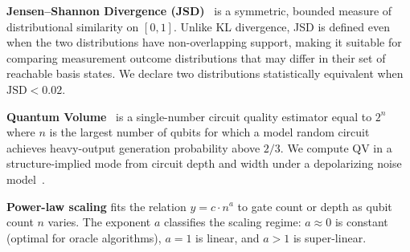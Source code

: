 \textbf{Jensen--Shannon Divergence (JSD)}~\cite{lin1991divergence} is a
symmetric, bounded measure of distributional similarity on $[0, 1]$.
Unlike KL divergence, JSD is defined even when the two distributions
have non-overlapping support, making it suitable for comparing
measurement outcome distributions that may differ in their set of
reachable basis states.
We declare two distributions statistically equivalent when
$\text{JSD} < 0.02$.

\textbf{Quantum Volume}~\cite{cross2019validating} is a single-number
circuit quality estimator equal to $2^n$ where $n$ is the largest number
of qubits for which a model random circuit achieves heavy-output
generation probability above $2/3$.
We compute QV in a structure-implied mode from circuit depth and width
under a depolarizing noise model~\cite{nielsen2010quantum}.

\textbf{Power-law scaling} fits the relation $y = c \cdot n^a$ to gate
count or depth as qubit count $n$ varies.
The exponent $a$ classifies the scaling regime: $a \approx 0$ is
constant (optimal for oracle algorithms), $a = 1$ is linear, and
$a > 1$ is super-linear.
